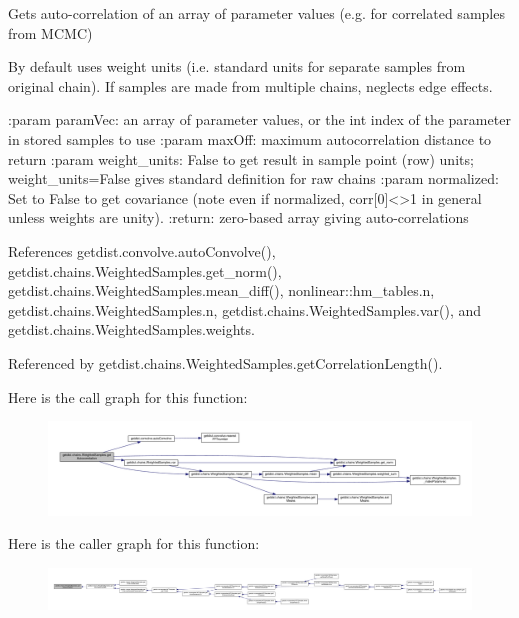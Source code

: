 \begin{DoxyVerb}Gets auto-correlation of an array of parameter values (e.g. for correlated samples from MCMC)

By default uses weight units (i.e. standard units for separate samples from original chain).
If samples are made from multiple chains, neglects edge effects.

:param paramVec: an array of parameter values, or the int index of the parameter in stored samples to use
:param maxOff: maximum autocorrelation distance to return
:param weight_units: False to get result in sample point (row) units; weight_units=False gives standard definition for raw chains
:param normalized: Set to False to get covariance (note even if normalized, corr[0]<>1 in general unless weights are unity).
:return: zero-based array giving auto-correlations
\end{DoxyVerb}
 

References getdist.\+convolve.\+auto\+Convolve(), getdist.\+chains.\+Weighted\+Samples.\+get\+\_\+norm(), getdist.\+chains.\+Weighted\+Samples.\+mean\+\_\+diff(), nonlinear\+::hm\+\_\+tables.\+n, getdist.\+chains.\+Weighted\+Samples.\+n, getdist.\+chains.\+Weighted\+Samples.\+var(), and getdist.\+chains.\+Weighted\+Samples.\+weights.



Referenced by getdist.\+chains.\+Weighted\+Samples.\+get\+Correlation\+Length().

Here is the call graph for this function\+:
\nopagebreak
\begin{figure}[H]
\begin{center}
\leavevmode
\includegraphics[width=350pt]{classgetdist_1_1chains_1_1WeightedSamples_a3635437a603d5c30394f83039c821859_cgraph}
\end{center}
\end{figure}
Here is the caller graph for this function\+:
\nopagebreak
\begin{figure}[H]
\begin{center}
\leavevmode
\includegraphics[width=350pt]{classgetdist_1_1chains_1_1WeightedSamples_a3635437a603d5c30394f83039c821859_icgraph}
\end{center}
\end{figure}
\mbox{\label{classgetdist_1_1chains_1_1WeightedSamples_ab8aaeca64fdb6cd42357a45118901526}} 
